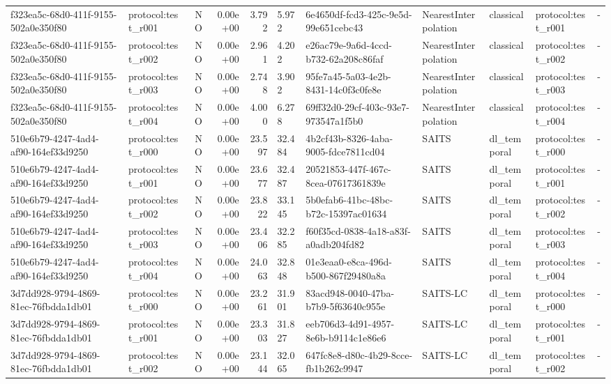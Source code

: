 \begin{table}[htbp]
\begin{tabular}{llrrr}
f323ea5c-68d0-411f-9155-502a0e350f80 & protocol:test\_r001 & NO & 0.00e+00 & 3.792 & 5.972 & 6e4650df-fcd3-425c-9e5d-99e651cebc43 & NearestInterpolation & classical & protocol:test\_r001 & - \\
f323ea5c-68d0-411f-9155-502a0e350f80 & protocol:test\_r002 & NO & 0.00e+00 & 2.961 & 4.202 & e26ac79e-9a6d-4ccd-b732-62a208c86faf & NearestInterpolation & classical & protocol:test\_r002 & - \\
f323ea5c-68d0-411f-9155-502a0e350f80 & protocol:test\_r003 & NO & 0.00e+00 & 2.748 & 3.902 & 95fe7a45-5a03-4e2b-8431-14c0f3c0fe8e & NearestInterpolation & classical & protocol:test\_r003 & - \\
f323ea5c-68d0-411f-9155-502a0e350f80 & protocol:test\_r004 & NO & 0.00e+00 & 4.000 & 6.278 & 69ff32d0-29cf-403c-93e7-973547a1f5b0 & NearestInterpolation & classical & protocol:test\_r004 & - \\
510e6b79-4247-4ad4-af90-164ef33d9250 & protocol:test\_r000 & NO & 0.00e+00 & 23.597 & 32.484 & 4b2cf43b-8326-4aba-9005-fdce7811cd04 & SAITS & dl\_temporal & protocol:test\_r000 & - \\
510e6b79-4247-4ad4-af90-164ef33d9250 & protocol:test\_r001 & NO & 0.00e+00 & 23.677 & 32.487 & 20521853-447f-467c-8cea-07617361839e & SAITS & dl\_temporal & protocol:test\_r001 & - \\
510e6b79-4247-4ad4-af90-164ef33d9250 & protocol:test\_r002 & NO & 0.00e+00 & 23.822 & 33.145 & 5b0efab6-41bc-48bc-b72c-15397ac01634 & SAITS & dl\_temporal & protocol:test\_r002 & - \\
510e6b79-4247-4ad4-af90-164ef33d9250 & protocol:test\_r003 & NO & 0.00e+00 & 23.406 & 32.285 & f60f35cd-0838-4a18-a83f-a0adb204fd82 & SAITS & dl\_temporal & protocol:test\_r003 & - \\
510e6b79-4247-4ad4-af90-164ef33d9250 & protocol:test\_r004 & NO & 0.00e+00 & 24.063 & 32.848 & 01e3eaa0-e8ca-496d-b500-867f29480a8a & SAITS & dl\_temporal & protocol:test\_r004 & - \\
3d7dd928-9794-4869-81ec-76fbdda1db01 & protocol:test\_r000 & NO & 0.00e+00 & 23.261 & 31.901 & 83acd948-0040-47ba-b7b9-5f63640c955e & SAITS-LC & dl\_temporal & protocol:test\_r000 & - \\
3d7dd928-9794-4869-81ec-76fbdda1db01 & protocol:test\_r001 & NO & 0.00e+00 & 23.303 & 31.827 & eeb706d3-4d91-4957-8e6b-b9114c1e86e6 & SAITS-LC & dl\_temporal & protocol:test\_r001 & - \\
3d7dd928-9794-4869-81ec-76fbdda1db01 & protocol:test\_r002 & NO & 0.00e+00 & 23.144 & 32.065 & 647fc8e8-d80c-4b29-8cce-fb1b262c9947 & SAITS-LC & dl\_temporal & protocol:test\_r002 & - \\

\end{tabular}
\end{table}
